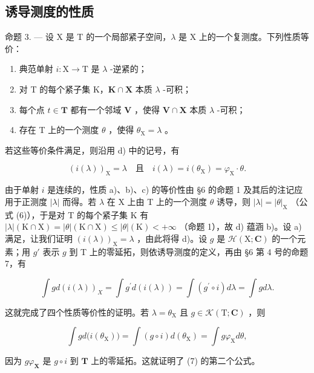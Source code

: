 \subsection{诱导测度的性质}

命题 3. --- 设 X 是 T 的一个局部紧子空间，\(\lambda\) 是 X 上的一个复测度。下列性质等价：

\begin{enumerate}
\def\labelenumi{\alph{enumi})}
\item
  典范单射 \(i:\mathrm{X}\to \mathrm{T}\) 是 \(\lambda\) -逆紧的；
\item
  对 T 的每个紧子集 K，\(\mathbf{K} \cap \mathbf{X}\) 本质 \(\lambda\) -可积；
\item
  每个点 \(t \in \mathbf{T}\) 都有一个邻域 \(\mathbf{V}\) ，使得 \(\mathbf{V} \cap \mathbf{X}\) 本质 \(\lambda\) -可积；
\item
  存在 T 上的一个测度 \(\theta\) ，使得 \(\theta_{\mathrm{X}} = \lambda\) 。
\end{enumerate}

若这些等价条件满足，则沿用 d) 中的记号，有

\[
\left(i (\lambda)\right) _ {\mathrm{X}} = \lambda \quad \text{且} \quad i (\lambda) = i (\theta_ {\mathrm{X}}) = \varphi_ {\mathrm{X}} \cdot \theta .\tag{7}
\]

由于单射 \(i\) 是连续的，性质 a)、b)、c) 的等价性由 §6 的命题 1 及其后的注记应用于正测度 \(|\lambda|\) 而得。若 \(\lambda\) 在 X 上由 T 上的一个测度 \(\theta\) 诱导，则 \(|\lambda| = |\theta|_{\mathrm{X}}\) （公式 (6)），于是对 T 的每个紧子集 K 有 \(|\lambda| (\mathrm{K} \cap \mathrm{X}) = |\theta| (\mathrm{K} \cap \mathrm{X}) \leqslant |\theta| (\mathrm{K}) < +\infty\) （命题 1），故 d) 蕴涵 b)。设 a) 满足，让我们证明 \(\left(i(\lambda)\right)_{\mathrm{X}} = \lambda\) ，由此将得 d)。设 \(g\) 是 \(\mathcal{H}(\mathrm{X}; \mathbf{C})\) 的一个元素；用 \(g'\) 表示 \(g\) 到 T 上的零延拓，则依诱导测度的定义，再由 §6 第 4 号的命题 7，有

\[
\int g d (i (\lambda)) _ {X} = \int g ^ {\prime} d (i (\lambda)) = \int (g ^ {\prime} \circ i) d \lambda = \int g d \lambda .
\]

这就完成了四个性质等价性的证明。若 \(\lambda = \theta_{\mathrm{X}}\) 且 \(g\in \mathcal{K}(\mathrm{T};\mathbf{C})\) ，则

\[
\int g d \bigl (i (\theta_ {\mathrm{X}}) \bigr) = \int (g \circ i) d (\theta_ {\mathrm{X}}) = \int g \varphi_ {\mathrm{X}} d \theta ,
\]

因为 \(g\varphi_{\mathbf{X}}\) 是 \(g \circ i\) 到 \(\mathbf{T}\) 上的零延拓。这就证明了 (7) 的第二个公式。

